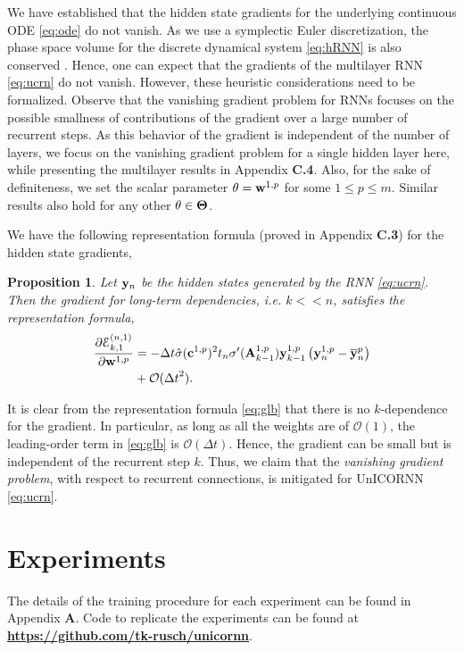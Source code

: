 \documentclass{article}
\newtheorem{proposition}[theorem]{Proposition}
\newcommand{\by}{{\bf y}}
\newcommand{\bw}{{\bf w}}
\newcommand{\bA}{{\bf A}}
\newcommand{\bc}{{\bf c}}
\newcommand{\ord}{{\mathcal O}}
\newcommand{\Dt}{{\Delta t}}
\newcommand{\E}{\EuScript{E}}
\begin{document}
We have established that the hidden state gradients for the underlying continuous ODE \eqref{eq:ode} do not vanish. As we use a symplectic Euler discretization, the phase space volume for the discrete dynamical system \eqref{eq:hRNN} is also conserved \cite{ss1,HLW1}. Hence, one can expect that the gradients of the multilayer RNN \eqref{eq:ucrn} do not vanish. However, these heuristic considerations need to be formalized. Observe that the vanishing gradient problem for RNNs focuses on the possible smallness of contributions of the gradient over a large number of recurrent steps. As this behavior of the gradient is independent of the number of layers, we focus on the vanishing gradient problem for a single hidden layer here, while presenting the multilayer results in Appendix {\bf C.4}. Also, for the sake of definiteness, we set the scalar parameter $\theta = \bw^{1,p}$ for some $1 \leq p \leq m$. Similar results also hold for any other $\theta \in {\bf \Theta}$. 

We have the following representation formula (proved in Appendix {\bf C.3}) for the hidden state gradients,
\begin{proposition}
\label{prop:4}
Let $\by_n$ be the hidden states generated by the RNN \eqref{eq:ucrn}.  Then the gradient for long-term dependencies, i.e. $k << n$, satisfies the representation formula,
\begin{equation}
     \label{eq:glb}
     \begin{aligned}
      \frac{\partial \E^{(n,1)}_{k,1}}{\partial \bw^{1,p}} &=
      -\Dt\hat{\sigma}(\bc^{1,p})^2t_n\sigma^{\prime}(\bA^{1,p}_{k-1})\by^{1,p}_{k-1}\left(\by^{1,p}_n-\overline{\by}^p_n\right) \\&+ \ord(\Dt^2).
     \end{aligned}
 \end{equation}
\end{proposition}
It is clear from the representation formula \eqref{eq:glb} that there is no $k$-dependence for the gradient. In particular, as long as all the weights are of $\ord(1)$, the leading-order term in \eqref{eq:glb} is $\ord(\Dt)$. Hence, the gradient can be small but is independent of the recurrent step $k$. Thus, we claim that the \emph{vanishing gradient problem}, with respect to recurrent connections, is mitigated for UnICORNN \eqref{eq:ucrn}.  
\section{Experiments}
The details of the training procedure
for each experiment can be found in Appendix {\bf A}. Code to replicate the experiments can be found at
\href{https://github.com/tk-rusch/unicornn}{\textbf{https://github.com/tk-rusch/unicornn}}.
\end{document}
